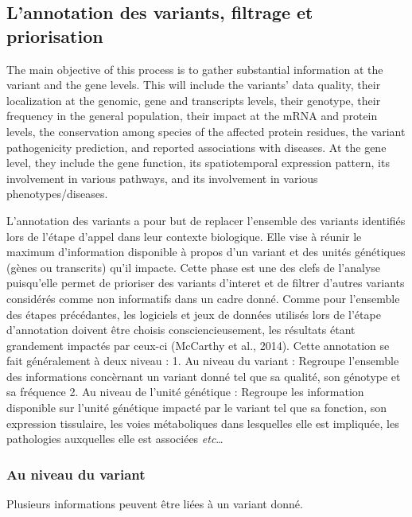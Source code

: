 \documentclass[12pt,twoside]{reedthesis}
\theoremstyle{definition}
\theoremstyle{definition}
\theoremstyle{remark}
\begin{document}
  \subsection{L'annotation des variants, filtrage et
  priorisation}\label{lannotation-des-variants-filtrage-et-priorisation}
  
  The main objective of this process is to gather substantial information
  at the variant and the gene levels. This will include the variants' data
  quality, their localization at the genomic, gene and transcripts levels,
  their genotype, their frequency in the general population, their impact
  at the mRNA and protein levels, the conservation among species of the
  affected protein residues, the variant pathogenicity prediction, and
  reported associations with diseases. At the gene level, they include the
  gene function, its spatiotemporal expression pattern, its involvement in
  various pathways, and its involvement in various phenotypes/diseases.
  
  L'annotation des variants a pour but de replacer l'ensemble des variants
  identifiés lors de l'étape d'appel dans leur contexte biologique. Elle
  vise à réunir le maximum d'information disponible à propos d'un variant
  et des unités génétiques (gènes ou transcrits) qu'il impacte. Cette
  phase est une des clefs de l'analyse puisqu'elle permet de prioriser des
  variants d'interet et de filtrer d'autres variants considérés comme non
  informatifs dans un cadre donné. Comme pour l'ensemble des étapes
  précédantes, les logiciels et jeux de données utilisés lors de l'étape
  d'annotation doivent être choisis consciencieusement, les résultats
  étant grandement impactés par ceux-ci (McCarthy et al., 2014). Cette
  annotation se fait généralement à deux niveau : 1. Au niveau du variant
  : Regroupe l'ensemble des informations concèrnant un variant donné tel
  que sa qualité, son génotype et sa fréquence 2. Au niveau de l'unité
  génétique : Regroupe les information disponible sur l'unité génétique
  impacté par le variant tel que sa fonction, son expression tissulaire,
  les voies métaboliques dans lesquelles elle est impliquée, les
  pathologies auxquelles elle est associées \emph{etc}\ldots{}
  
  \subsubsection{Au niveau du variant}\label{au-niveau-du-variant}
  
  Plusieurs informations peuvent être liées à un variant donné.
  
\end{document}
